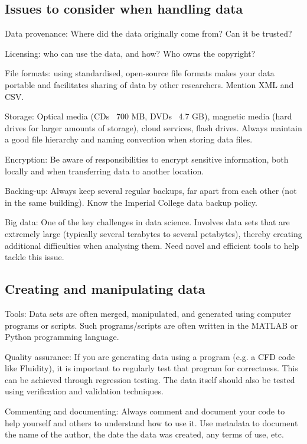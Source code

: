 \documentclass[a4paper,11pt]{article}
\begin{document}
\subsection{Issues to consider when handling data}
Data provenance: Where did the data originally come from? Can it be trusted?

Licensing: who can use the data, and how? Who owns the copyright?

File formats: using standardised, open-source file formats makes your data portable and facilitates sharing of data by other researchers. Mention XML and CSV.

Storage: Optical media (CDs ~700 MB, DVDs ~4.7 GB), magnetic media (hard drives for larger amounts of storage), cloud services, flash drives. Always maintain a good file hierarchy and naming convention when storing data files.

Encryption: Be aware of responsibilities to encrypt sensitive information, both locally and when transferring data to another location.

Backing-up: Always keep several regular backups, far apart from each other (not in the same building). Know the Imperial College data backup policy.

Big data: One of the key challenges in data science. Involves data sets that are extremely large (typically several terabytes to several petabytes), thereby creating additional difficulties when analysing them. Need novel and efficient tools to help tackle this issue.

\subsection{Creating and manipulating data}
Tools: Data sets are often merged, manipulated, and generated using computer programs or scripts. Such programs/scripts are often written in the MATLAB or Python programming language.

Quality assurance: If you are generating data using a program (e.g. a CFD code like Fluidity), it is important to regularly test that program for correctness. This can be achieved through regression testing. The data itself should also be tested using verification and validation techniques.

Commenting and documenting: Always comment and document your code to help yourself and others to understand how to use it. Use metadata to document the name of the author, the date the data was created, any terms of use, etc.
\end{document}
